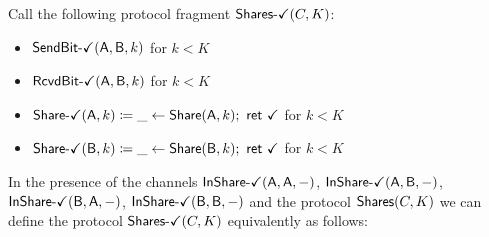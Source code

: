 Call the following protocol fragment $\SharesOk(C,K)$:
\begin{itemize}
\item {\color{teal} $\SendBitOk(\A,\B,k)$ for $k < K$}
\item {\color{teal} $\RcvdBitOk(\A,\B,k)$ for $k < K$}
\item {\color{teal} $\ShareOk(\A,k) \coloneqq \_ \leftarrow \Share(\A,k); \ \ret{\checkmark}$ for $k < K$}
\item {\color{teal} $\ShareOk(\B,k) \coloneqq \_ \leftarrow \Share(\B,k); \ \ret{\checkmark}$ for $k < K$}
\end{itemize}

\noindent In the presence of the channels $\InShareOk(\A,\A,-)$, $\InShareOk(\A,\B,-)$, $\InShareOk(\B,\A,-)$, $\InShareOk(\B,\B,-)$ and the protocol $\Shares(C,K)$ we can define the protocol $\SharesOk(C,K)$ equivalently as follows:

